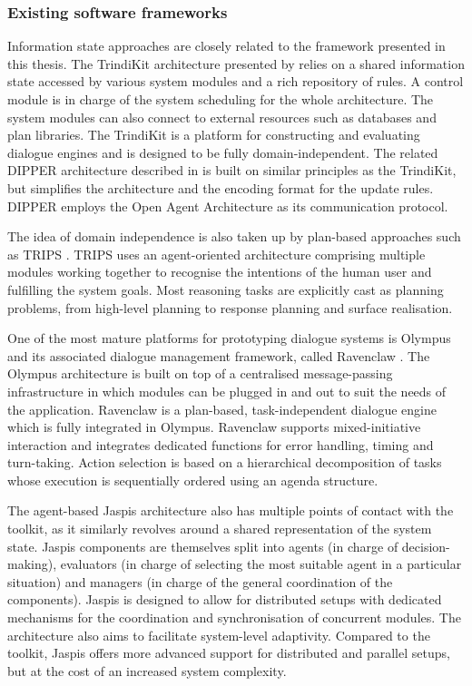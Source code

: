 \subsubsection*{Existing software frameworks}

Information state approaches are closely related to the framework presented in this thesis. The TrindiKit architecture presented by \cite{Larsson:2000} relies on a shared information state accessed by various system modules and a rich repository of rules. A control module is in charge of the system scheduling for the whole architecture. The system modules can also connect to external resources such as databases and plan libraries.   The TrindiKit is a platform for constructing and evaluating dialogue engines and is designed to be fully domain-independent. The related DIPPER architecture described in \cite{Bos2003} is built on similar principles as the TrindiKit, but simplifies the architecture and the encoding format for the  update rules.  DIPPER employs the Open Agent Architecture as its communication protocol.

The idea of domain independence is also taken up by plan-based approaches such as TRIPS \citep[The Rochester Interactive Planning System, cf. ][]{Allen:2000:AGD:973935.973937}. TRIPS uses an agent-oriented architecture comprising multiple modules working together to recognise the intentions of the human user and fulfilling the system goals.  Most reasoning tasks are explicitly cast as planning problems, from high-level planning to response planning and surface realisation.  

One of the most mature platforms for prototyping dialogue systems is Olympus and its associated dialogue management framework, called Ravenclaw \citep{Bohus:2007,Bohus:2009}.  The Olympus architecture is built on top of a centralised message-passing infrastructure in which modules can be plugged in and out to suit the needs of the application.  Ravenclaw is a plan-based, task-independent dialogue engine which is fully integrated in Olympus.  Ravenclaw supports mixed-initiative interaction and integrates dedicated functions for error handling, timing and turn-taking. Action selection is based on a hierarchical decomposition of tasks whose execution is sequentially ordered using an agenda structure. 

The agent-based Jaspis architecture \citep{jaspis2004} also has multiple points of contact with the \opendial{} toolkit, as it similarly revolves around a shared representation of the system state.  Jaspis components are themselves split into agents (in charge of decision-making), evaluators (in charge of selecting the most suitable agent in a particular situation) and managers (in charge of the general coordination of the components). Jaspis is designed to allow for distributed setups with dedicated mechanisms for the coordination and synchronisation of concurrent modules.  The architecture also aims to facilitate system-level adaptivity.  Compared to the \opendial{} toolkit, Jaspis offers more advanced support for distributed and parallel setups, but at the cost of an increased system complexity.  

